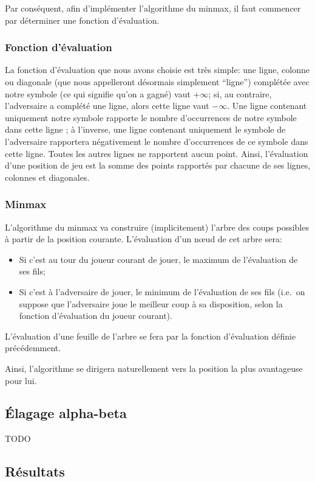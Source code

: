 Par conséquent, afin d'implémenter l'algorithme du minmax, il faut
commencer par déterminer une fonction d'évaluation.

\subsubsection{Fonction d'évaluation}
La fonction d'évaluation que nous avons choisie est très simple: une
ligne, colonne ou diagonale (que nous appelleront désormais simplement
``ligne'') complétée avec notre symbole (ce qui signifie qu'on a
gagné) vaut $+\infty$; si, au contraire, l'adversaire a complété une
ligne, alors cette ligne vaut $-\infty$. Une ligne contenant
uniquement notre symbole rapporte le nombre d'occurrences de notre
symbole dans cette ligne ; à l'inverse, une ligne contenant uniquement
le symbole de l'adversaire rapportera négativement le nombre
d'occurrences de ce symbole dans cette ligne.
Toutes les autres lignes ne rapportent aucun point.
Ainsi, l'évaluation d'une position de jeu est la somme des points
rapportés par chacune de ses lignes, colonnes et diagonales.

\subsubsection{Minmax}
L'algorithme du minmax va construire (implicitement) l'arbre des coups
possibles à partir de la position courante.
L'évaluation d'un nœud de cet arbre sera:
\begin{itemize}
  \item Si c'est au tour du joueur courant de jouer, le maximum de
    l'évaluation de ses fils;
  \item Si c'est à l'adversaire de jouer, le minimum de l'évaluation
    de ses fils (i.e.\ on suppose que l'adversaire joue le meilleur
    coup à sa disposition, selon la fonction d'évaluation du joueur courant).
\end{itemize}

L'évaluation d'une feuille de l'arbre se fera par la fonction
d'évaluation définie précédemment.

Ainsi, l'algorithme se dirigera naturellement vers la position la plus
avantageuse pour lui. 

\subsection{Élagage alpha-beta}
TODO

\subsection{Résultats}
